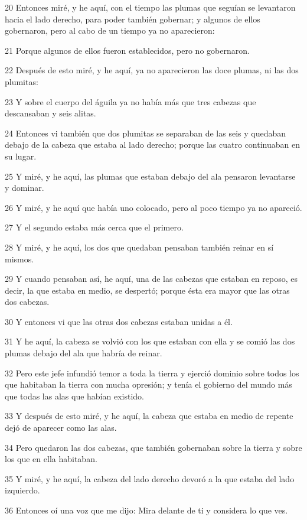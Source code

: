 \par 20 Entonces miré, y he aquí, con el tiempo las plumas que seguían se levantaron hacia el lado derecho, para poder también gobernar; y algunos de ellos gobernaron, pero al cabo de un tiempo ya no aparecieron:
\par 21 Porque algunos de ellos fueron establecidos, pero no gobernaron.
\par 22 Después de esto miré, y he aquí, ya no aparecieron las doce plumas, ni las dos plumitas:
\par 23 Y sobre el cuerpo del águila ya no había más que tres cabezas que descansaban y seis alitas.
\par 24 Entonces vi también que dos plumitas se separaban de las seis y quedaban debajo de la cabeza que estaba al lado derecho; porque las cuatro continuaban en su lugar.
\par 25 Y miré, y he aquí, las plumas que estaban debajo del ala pensaron levantarse y dominar.
\par 26 Y miré, y he aquí que había uno colocado, pero al poco tiempo ya no apareció.
\par 27 Y el segundo estaba más cerca que el primero.
\par 28 Y miré, y he aquí, los dos que quedaban pensaban también reinar en sí mismos.
\par 29 Y cuando pensaban así, he aquí, una de las cabezas que estaban en reposo, es decir, la que estaba en medio, se despertó; porque ésta era mayor que las otras dos cabezas.
\par 30 Y entonces vi que las otras dos cabezas estaban unidas a él.
\par 31 Y he aquí, la cabeza se volvió con los que estaban con ella y se comió las dos plumas debajo del ala que habría de reinar.
\par 32 Pero este jefe infundió temor a toda la tierra y ejerció dominio sobre todos los que habitaban la tierra con mucha opresión; y tenía el gobierno del mundo más que todas las alas que habían existido.
\par 33 Y después de esto miré, y he aquí, la cabeza que estaba en medio de repente dejó de aparecer como las alas.
\par 34 Pero quedaron las dos cabezas, que también gobernaban sobre la tierra y sobre los que en ella habitaban.
\par 35 Y miré, y he aquí, la cabeza del lado derecho devoró a la que estaba del lado izquierdo.
\par 36 Entonces oí una voz que me dijo: Mira delante de ti y considera lo que ves.
